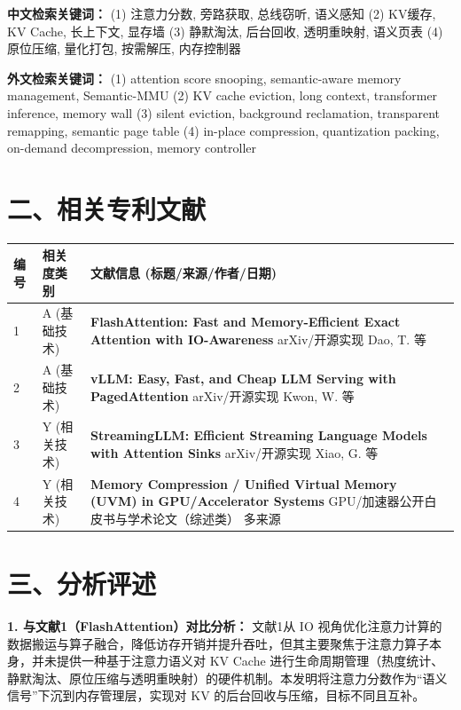\documentclass[12pt,a4paper]{article}
\begin{document}
\textbf{中文检索关键词：}
(1) 注意力分数, 旁路获取, 总线窃听, 语义感知
(2) KV缓存, KV Cache, 长上下文, 显存墙
(3) 静默淘汰, 后台回收, 透明重映射, 语义页表
(4) 原位压缩, 量化打包, 按需解压, 内存控制器

\textbf{外文检索关键词：}
(1) attention score snooping, semantic-aware memory management, Semantic-MMU
(2) KV cache eviction, long context, transformer inference, memory wall
(3) silent eviction, background reclamation, transparent remapping, semantic page table
(4) in-place compression, quantization packing, on-demand decompression, memory controller

\section*{二、相关专利文献}

\renewcommand{\arraystretch}{1.5}
\begin{longtable}{|p{1.5cm}|p{6cm}|p{7.5cm}|}
\hline
\textbf{编号} & \textbf{相关度类别} & \textbf{文献信息 (标题/来源/作者/日期)} \\
\hline
1 & A (基础技术) & \textbf{FlashAttention: Fast and Memory-Efficient Exact Attention with IO-Awareness} \newline arXiv/开源实现 \newline Dao, T. 等 \\
\hline
2 & A (基础技术) & \textbf{vLLM: Easy, Fast, and Cheap LLM Serving with PagedAttention} \newline arXiv/开源实现 \newline Kwon, W. 等 \\
\hline
3 & Y (相关技术) & \textbf{StreamingLLM: Efficient Streaming Language Models with Attention Sinks} \newline arXiv/开源实现 \newline Xiao, G. 等 \\
\hline
4 & Y (相关技术) & \textbf{Memory Compression / Unified Virtual Memory (UVM) in GPU/Accelerator Systems} \newline GPU/加速器公开白皮书与学术论文（综述类） \newline 多来源 \\
\hline
\end{longtable}

\section*{三、分析评述}

\textbf{1. 与文献1（FlashAttention）对比分析：}
文献1从 IO 视角优化注意力计算的数据搬运与算子融合，降低访存开销并提升吞吐，但其主要聚焦于注意力算子本身，并未提供一种基于注意力语义对 KV Cache 进行生命周期管理（热度统计、静默淘汰、原位压缩与透明重映射）的硬件机制。本发明将注意力分数作为“语义信号”下沉到内存管理层，实现对 KV 的后台回收与压缩，目标不同且互补。
\end{document}
